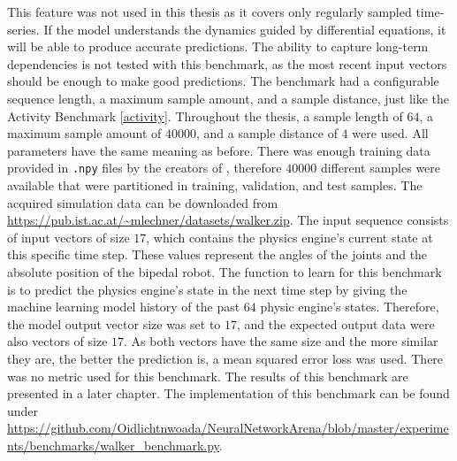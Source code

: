 \documentclass[draft,final]{vutinfth} %
\begin{document}
This feature was not used in this thesis as it covers only regularly sampled time-series.
If the model understands the dynamics guided by differential equations, it will be able to produce accurate predictions.
The ability to capture long-term dependencies is not tested with this benchmark, as the most recent input vectors should be enough to make good predictions.
The benchmark had a configurable sequence length, a maximum sample amount, and a sample distance, just like the Activity Benchmark \ref{activity}.
Throughout the thesis, a sample length of $64$, a maximum sample amount of $40000$, and a sample distance of $4$ were used.
All parameters have the same meaning as before.
There was enough training data provided in \texttt{.npy} files by the creators of \cite{ODELSTM}, therefore $40000$ different samples were available that were partitioned in training, validation, and test samples.
The acquired simulation data can be downloaded from \url{https://pub.ist.ac.at/~mlechner/datasets/walker.zip}.
The input sequence consists of input vectors of size $17$, which contains the physics engine's current state at this specific time step.
These values represent the angles of the joints and the absolute position of the bipedal robot.
The function to learn for this benchmark is to predict the physics engine's state in the next time step by giving the machine learning model history of the past $64$ physic engine's states.
Therefore, the model output vector size was set to $17$, and the expected output data were also vectors of size $17$.
As both vectors have the same size and the more similar they are, the better the prediction is, a mean squared error loss was used.
There was no metric used for this benchmark.
The results of this benchmark are presented in a later chapter.
The implementation of this benchmark can be found under \url{https://github.com/Oidlichtnwoada/NeuralNetworkArena/blob/master/experiments/benchmarks/walker_benchmark.py}.
\end{document}
